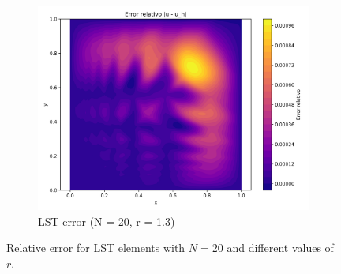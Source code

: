 \documentclass[12pt]{article}
\begin{document}
\begin{figure}[H]
    \hfill
    \begin{subfigure}[t]{0.32\textwidth}
        \centering
        \includegraphics[width=\textwidth]{Graficos/23/LST_relative_error_colormap.png}
        \caption{LST error (N = 20, r = 1.3)}
        \label{fig:lst_error_r1.3_n20}
    \end{subfigure}
    \caption{Relative error for LST elements with $N = 20$ and different values of $r$.}
    \label{fig:lst_error_comparison_n20}
\end{figure}
\end{document}
